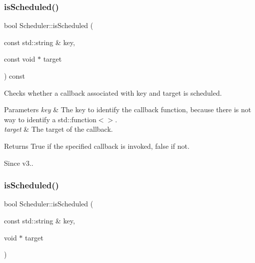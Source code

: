 \subsubsection{\texorpdfstring{is\+Scheduled()}{isScheduled()}\hspace{0.1cm}{\footnotesize\ttfamily [1/4]}}
{\footnotesize\ttfamily bool Scheduler\+::is\+Scheduled (\begin{DoxyParamCaption}\item[{const std\+::string \&}]{key,  }\item[{const void $\ast$}]{target }\end{DoxyParamCaption}) const}

Checks whether a callback associated with \textquotesingle{}key\textquotesingle{} and \textquotesingle{}target\textquotesingle{} is scheduled. 
\begin{DoxyParams}{Parameters}
{\em key} & The key to identify the callback function, because there is not way to identify a std\+::function$<$$>$. \\
\hline
{\em target} & The target of the callback. \\
\hline
\end{DoxyParams}
\begin{DoxyReturn}{Returns}
True if the specified callback is invoked, false if not. 
\end{DoxyReturn}
\begin{DoxySince}{Since}
v3.. 
\end{DoxySince}
\mbox{\label{classScheduler_a5b534eae62394806603e522ab4191d3b}} 
\subsubsection{\texorpdfstring{is\+Scheduled()}{isScheduled()}\hspace{0.1cm}{\footnotesize\ttfamily [2/4]}}
{\footnotesize\ttfamily bool Scheduler\+::is\+Scheduled (\begin{DoxyParamCaption}\item[{const std\+::string \&}]{key,  }\item[{void $\ast$}]{target }\end{DoxyParamCaption})}

